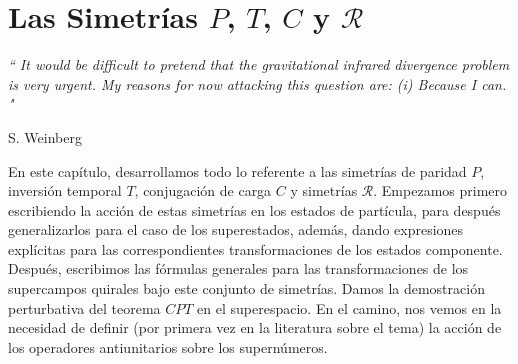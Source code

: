 \chapter{Las Simetrías $ \mathit{P} $, $ \mathit{T} $,  $ \mathit{C} $ y $ \mathcal{R} $}
\label{chap:7}
\epigraph{\textit{`` It would be difficult to pretend that the gravitational
infrared divergence problem is very urgent. My reasons for now attacking this question are: (i) Because I can. "}}{S. Weinberg~\cite{Weinberg:1965nx}}

En este capítulo, desarrollamos todo lo referente a las simetrías de paridad  $ \mathit{P} $, inversión temporal $ \mathit{T} $, conjugación de carga  $ \mathit{C} $ y simetrías $ \mathcal{R} $. Empezamos primero escribiendo la acción de estas simetrías en los estados de partícula, para después generalizarlos para el caso de los superestados,  además, dando expresiones explícitas para las correspondientes transformaciones de los estados componente. Después, escribimos las fórmulas generales para  las transformaciones de los  supercampos quirales bajo este conjunto de simetrías. Damos la demostración perturbativa del teorema $ CPT $ en el superespacio. En el camino, nos vemos en la necesidad de definir (por primera vez en la literatura sobre el tema) la acción de los operadores antiunitarios sobre los supernúmeros. 
